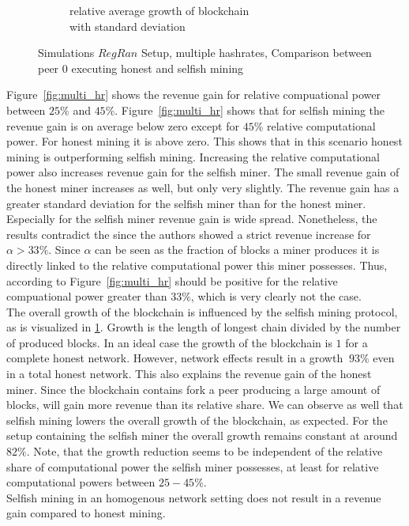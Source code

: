 \begin{figure}[h! t]
\begin{subfigure}[b]{0.48\textwidth}
		\caption{relative average growth of blockchain \\with standard deviation}
		\label{fig:multi_hr_growth}
	\end{subfigure}
	\caption{Simulations $RegRan$ Setup, multiple hashrates, Comparison between peer $0$ executing honest and selfish mining}
	\label{fig:mhr}
\end{figure}
Figure~\ref{fig:multi_hr} shows the revenue gain for relative compuational power between $25\% $ and $45\% $. Figure~\ref{fig:multi_hr} shows that for selfish mining the revenue gain is on average below zero except for $45\% $ relative computational power. For honest mining it is above zero. This shows that in this scenario honest mining is outperforming selfish mining. Increasing the relative computational power also increases revenue gain for the selfish miner. The small revenue gain of the honest miner increases as well, but only very slightly. The revenue gain has a greater standard deviation for the selfish miner than for the honest miner. Especially for the selfish miner revenue gain is wide spread. Nonetheless, the results contradict the  since the authors showed a strict revenue increase for $\alpha > 33\% $. Since $\alpha$ can be seen as the fraction of blocks a miner produces it is directly linked to the relative computational power this miner possesses. Thus, according to  Figure~\ref{fig:multi_hr} should be positive for the relative compuational power greater than $33\% $, which is very clearly not the case.\\
The overall growth of the blockchain is influenced by the selfish mining protocol, as is visualized in \ref{fig:multi_hr_growth}. Growth is the length of longest chain divided by the number of produced blocks. In an ideal case the growth of the blockchain is $1$ for a complete honest network. However, network effects result in a growth $~93\% $ even in a total honest network. This also explains the revenue gain of the honest miner. Since the blockchain contains fork a peer producing a large amount of blocks, will gain more revenue than its relative share. We can observe as well that selfish mining lowers the overall growth of the blockchain, as expected. For the setup containing the selfish miner the overall growth remains constant at around $82\% $. Note, that the growth reduction seems to be independent of the relative share of computational power the selfish miner possesses, at least for relative computational powers between $25-45\% $.\\
Selfish mining in an homogenous network setting does not result in a revenue gain compared to honest mining.


